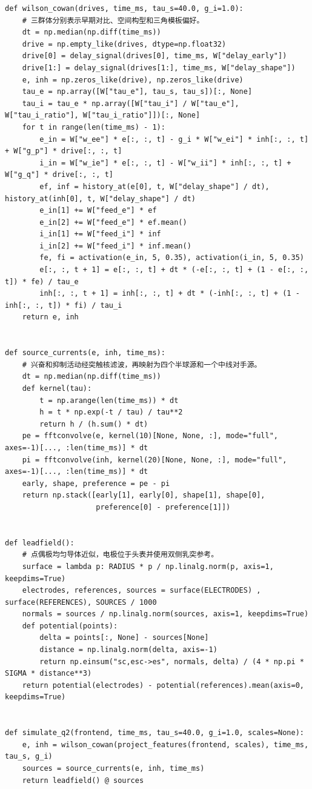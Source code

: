 \begin{lstlisting}[style=appendixPython]
def wilson_cowan(drives, time_ms, tau_s=40.0, g_i=1.0):
    # 三群体分别表示早期对比、空间构型和三角模板偏好。
    dt = np.median(np.diff(time_ms))
    drive = np.empty_like(drives, dtype=np.float32)
    drive[0] = delay_signal(drives[0], time_ms, W["delay_early"])
    drive[1:] = delay_signal(drives[1:], time_ms, W["delay_shape"])
    e, inh = np.zeros_like(drive), np.zeros_like(drive)
    tau_e = np.array([W["tau_e"], tau_s, tau_s])[:, None]
    tau_i = tau_e * np.array([W["tau_i"] / W["tau_e"], W["tau_i_ratio"], W["tau_i_ratio"]])[:, None]
    for t in range(len(time_ms) - 1):
        e_in = W["w_ee"] * e[:, :, t] - g_i * W["w_ei"] * inh[:, :, t] + W["g_p"] * drive[:, :, t]
        i_in = W["w_ie"] * e[:, :, t] - W["w_ii"] * inh[:, :, t] + W["g_q"] * drive[:, :, t]
        ef, inf = history_at(e[0], t, W["delay_shape"] / dt), history_at(inh[0], t, W["delay_shape"] / dt)
        e_in[1] += W["feed_e"] * ef
        e_in[2] += W["feed_e"] * ef.mean()
        i_in[1] += W["feed_i"] * inf
        i_in[2] += W["feed_i"] * inf.mean()
        fe, fi = activation(e_in, 5, 0.35), activation(i_in, 5, 0.35)
        e[:, :, t + 1] = e[:, :, t] + dt * (-e[:, :, t] + (1 - e[:, :, t]) * fe) / tau_e
        inh[:, :, t + 1] = inh[:, :, t] + dt * (-inh[:, :, t] + (1 - inh[:, :, t]) * fi) / tau_i
    return e, inh


def source_currents(e, inh, time_ms):
    # 兴奋和抑制活动经突触核滤波，再映射为四个半球源和一个中线对手源。
    dt = np.median(np.diff(time_ms))
    def kernel(tau):
        t = np.arange(len(time_ms)) * dt
        h = t * np.exp(-t / tau) / tau**2
        return h / (h.sum() * dt)
    pe = fftconvolve(e, kernel(10)[None, None, :], mode="full", axes=-1)[..., :len(time_ms)] * dt
    pi = fftconvolve(inh, kernel(20)[None, None, :], mode="full", axes=-1)[..., :len(time_ms)] * dt
    early, shape, preference = pe - pi
    return np.stack([early[1], early[0], shape[1], shape[0],
                     preference[0] - preference[1]])


def leadfield():
    # 点偶极均匀导体近似，电极位于头表并使用双侧乳突参考。
    surface = lambda p: RADIUS * p / np.linalg.norm(p, axis=1, keepdims=True)
    electrodes, references, sources = surface(ELECTRODES) , surface(REFERENCES), SOURCES / 1000
    normals = sources / np.linalg.norm(sources, axis=1, keepdims=True)
    def potential(points):
        delta = points[:, None] - sources[None]
        distance = np.linalg.norm(delta, axis=-1)
        return np.einsum("sc,esc->es", normals, delta) / (4 * np.pi * SIGMA * distance**3)
    return potential(electrodes) - potential(references).mean(axis=0, keepdims=True)


def simulate_q2(frontend, time_ms, tau_s=40.0, g_i=1.0, scales=None):
    e, inh = wilson_cowan(project_features(frontend, scales), time_ms, tau_s, g_i)
    sources = source_currents(e, inh, time_ms)
    return leadfield() @ sources

\end{lstlisting}
\clearpage

